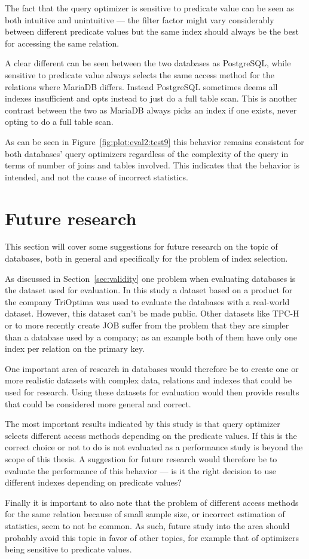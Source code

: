 The fact that the query optimizer is sensitive to predicate value can be seen as
both intuitive and unintuitive --- the filter factor might vary considerably
between different predicate values but the same index should always be the best
for accessing the same relation.

A clear different can be seen between the two databases as PostgreSQL, while
sensitive to predicate value always selects the same access method for the
relations where MariaDB differs. Instead PostgreSQL sometimes deems all indexes
insufficient and opts instead to just do a full table scan. This is another
contrast between the two as MariaDB always picks an index if one exists, never
opting to do a full table scan.

As can be seen in Figure~\ref{fig:plot:eval2:test9} this behavior remains
consistent for both databases' query optimizers regardless of the complexity of
the query in terms of number of joins and tables involved. This indicates that
the behavior is intended, and not the cause of incorrect statistics.

\section{Future research}
This section will cover some suggestions for future research on the topic of
databases, both in general and specifically for the problem of index selection.

As discussed in Section~\ref{sec:validity} one problem when evaluating
databases is the dataset used for evaluation. In this study a dataset based on a
product for the company TriOptima was used to evaluate the databases with a real-world
dataset. However, this dataset can't be made public. Other datasets like TPC-H
or to more recently create JOB suffer from the problem that they are simpler
than a database used by a company; as an example both of them have only one
index per relation on the primary key.

One important area of research in databases would therefore be to create one or
more realistic datasets with complex data, relations and indexes that could be
used for research. Using these datasets for evaluation would then provide
results that could be considered more general and correct.

The most important results indicated by this study is that query optimizer
selects different access methods depending on the predicate values. If this
is the correct choice or not to do is not evaluated as a performance study is
beyond the scope of this thesis. A suggestion for future research would
therefore be to evaluate the performance of this behavior --- is it the right
decision to use different indexes depending on predicate values?

Finally it is important to also note that the problem of different access
methods for the same relation because of small sample size, or incorrect
estimation of statistics, seem to not be common. As such, future study into the
area should probably avoid this topic in favor of other topics, for example that
of optimizers being sensitive to predicate values.